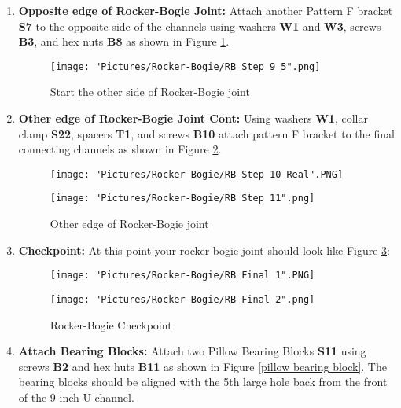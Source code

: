 \documentclass[12pt]{article}
\begin{document}
\begin{enumerate}
\item \textbf{Opposite edge of Rocker-Bogie Joint:} Attach another Pattern F bracket \textbf{S7} to the opposite side of the channels using washers \textbf{W1} and \textbf{W3}, screws \textbf{B3}, and hex nuts \textbf{B8} as shown in Figure \ref{start other edge rocker bogie}. 

\begin{figure}[H]
	\centering
	\texttt{[image: "Pictures/Rocker-Bogie/RB Step 9\_5".png]}
	\caption{Start the other side of Rocker-Bogie joint}
	\label{start other edge rocker bogie}
\end{figure}

\item \textbf{Other edge of Rocker-Bogie Joint Cont: } Using washers \textbf{W1}, collar clamp \textbf{S22},  spacers \textbf{T1}, and screws \textbf{B10} attach pattern F bracket to the final connecting channels as shown in Figure \ref{other edge rocker bogie}. 

\begin{figure}[H]
  \centering
  \begin{minipage}[b]{0.45\textwidth}
    \texttt{[image: "Pictures/Rocker-Bogie/RB Step 10 Real".PNG]}
  \end{minipage}
  \hfill
  \begin{minipage}[b]{0.45\textwidth}
    \texttt{[image: "Pictures/Rocker-Bogie/RB Step 11".png]}
  \end{minipage}
  \caption{Other edge of Rocker-Bogie joint}
  \label{other edge rocker bogie}
\end{figure}

\item \textbf{Checkpoint:} At this point your rocker bogie joint should look like Figure \ref{checkpoint}: 

\begin{figure}[H]
  \centering
  \begin{minipage}[b]{0.45\textwidth}
    \texttt{[image: "Pictures/Rocker-Bogie/RB Final 1".PNG]}
  \end{minipage}
  \hfill
  \begin{minipage}[b]{0.45\textwidth}
    \texttt{[image: "Pictures/Rocker-Bogie/RB Final 2".png]}
  \end{minipage}
  \caption{Rocker-Bogie Checkpoint}
  \label{checkpoint}
\end{figure}

\item \textbf{Attach Bearing Blocks:} Attach two Pillow Bearing Blocks \textbf{S11} using screws \textbf{B2} and hex huts \textbf{B11} as shown in Figure \ref{pillow bearing block}. The bearing blocks should be aligned with the 5th large hole back from the front of the 9-inch U channel. 


\end{enumerate}
\end{document}
